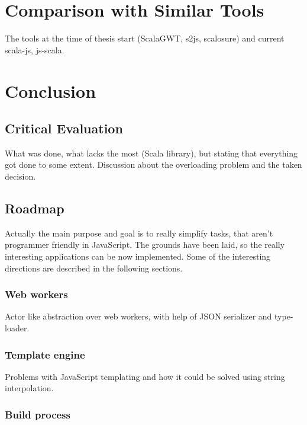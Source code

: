 \documentclass[12pt,a4paper]{report}
\begin{document}
\chapter{Comparison with Similar Tools}

The tools at the time of thesis start (ScalaGWT, s2js, scalosure) and current scala-js, js-scala.



\chapter{Conclusion}

\section{Critical Evaluation}

What was done, what lacks the most (Scala library), but stating that everything got done to some extent. Discussion about the overloading problem and the taken decision.

\section{Roadmap}

Actually the main purpose and goal is to really simplify tasks, that aren't programmer friendly in JavaScript. The grounds have been laid, so the really interesting applications can be now implemented. Some of the interesting directions are described in the following sections.

\subsection{Web workers}

Actor like abstraction over web workers, with help of JSON serializer and type-loader.

\subsection{Template engine}

Problems with JavaScript templating and how it could be solved using string interpolation.

\subsection{Build process}
\end{document}
